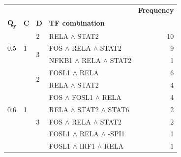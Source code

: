 \begin{tabular}{llllr}
\toprule
 &  &  &  & \textbf{Frequency} \\
$\mathbf{Q_y}$ & $\mathbf{C}$ & $\mathbf{D}$ & \textbf{TF combination} &  \\
\midrule
\multirow[t]{3}{*}{0.5} & \multirow[t]{3}{*}{1} & 2 & {RELA $\wedge$ STAT2} & 10 \\
\cline{3-5}
 &  & \multirow[t]{2}{*}{3} & {FOS $\wedge$ RELA $\wedge$ STAT2} & 9 \\
 &  &  & {NFKB1 $\wedge$ RELA $\wedge$ STAT2} & 1 \\
\cline{1-5} \cline{2-5} \cline{3-5}
\multirow[t]{7}{*}{0.6} & \multirow[t]{7}{*}{1} & \multirow[t]{2}{*}{2} & {FOSL1 $\wedge$ RELA} & 6 \\
 &  &  & {RELA $\wedge$ STAT2} & 4 \\
\cline{3-5}
 &  & \multirow[t]{5}{*}{3} & {FOS $\wedge$ FOSL1 $\wedge$ RELA} & 4 \\
 &  &  & {RELA $\wedge$ STAT2 $\wedge$ STAT6} & 2 \\
 &  &  & {FOS $\wedge$ RELA $\wedge$ STAT2} & 2 \\
 &  &  & {FOSL1 $\wedge$ RELA $\wedge$ -SPI1} & 1 \\
 &  &  & {FOSL1 $\wedge$ IRF1 $\wedge$ RELA} & 1 \\
\cline{1-5} \cline{2-5} \cline{3-5}
\bottomrule
\end{tabular}
